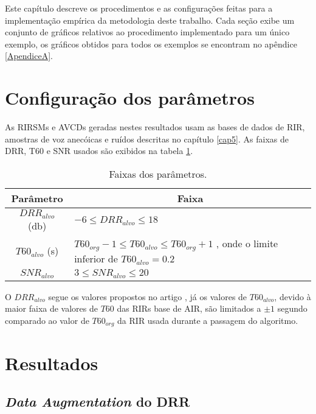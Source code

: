 Este capítulo descreve os procedimentos e as configurações feitas para a implementação empírica da metodologia deste trabalho.
Cada seção exibe um conjunto de gráficos relativos ao procedimento implementado para um único exemplo, os gráficos obtidos para todos
os exemplos se encontram no apêndice \ref{ApendiceA}.

\section{Configuração dos parâmetros}

As RIRSMs e AVCDs geradas nestes resultados usam as bases de dados de RIR, amostras de voz anecóicas e ruídos descritas no capítulo \ref{cap5}.
As faixas de DRR, T60 e SNR usados são exibidos na tabela \ref{tbl:config-param}.

\begin{table} [H]
    \centering
    \caption{Faixas dos parâmetros.}
    \label{tbl:config-param}
    \begin{tabular}{c|p{9cm}}

        \multicolumn{1}{c|}{\textbf{Parâmetro}} & \multicolumn{1}{c}{\textbf{Faixa}} \\
        \hline 

        $DRR_{alvo}$ (db) & $-6 \le DRR_{alvo} \le 18 $ \\
        $T60_{alvo}$ (s) & $T60_{org} - 1  \le T60_{alvo} \le T60_{org} + 1$ , onde o limite inferior de $T60_{alvo} = 0.2$ \\
        $SNR_{alvo}$ & $3 \le SNR_{alvo} \le 20 $ \\

    \end{tabular}
\end{table}

O $DRR_{alvo}$ segue os valores propostos no artigo \cite{RIR_Data_Aug}, já os valores de $T60_{alvo}$, devido à maior faixa de valores 
de $T60$ das RIRs base de AIR, são limitados a $\pm 1 $ segundo comparado ao valor de $T60_{org}$ da RIR usada durante a passagem do algoritmo.

\section{Resultados}

\subsection{\textit{Data Augmentation} do DRR}

